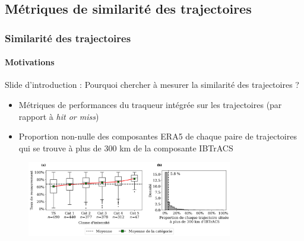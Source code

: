\documentclass[aspectratio=169, usepdftitle=false, xcolor={dvipsnames}, 9pt,table]{beamer}
\begin{document}
\subsection[Similarité des trajectoires]{Métriques de similarité des trajectoires}
\makesubsecslide
\begin{frame}[c]
    \frametitle{Similarité des trajectoires}
    \framesubtitle{Motivations}
    Slide d'introduction : Pourquoi chercher à mesurer la similarité des trajectoires ?
    \begin{itemize}
        \item Métriques de performances du traqueur intégrée sur les trajectoires (par rapport à \textit{hit or miss})
        \item Proportion non-nulle des composantes ERA5 de chaque paire de trajectoires qui se trouve à plus de 300 km de la composante IBTrACS
    \end{itemize}
    \begin{figure}
        \centering
        \includegraphics[width=0.8\textwidth]{Figures/coverage_ratio_and_missed.png}
    \end{figure}
\end{frame}
\end{document}

